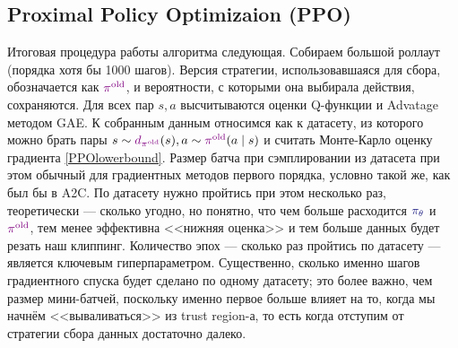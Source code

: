 \subsection{Proximal Policy Optimizaion (PPO)}

Итоговая процедура работы алгоритма следующая. Собираем большой роллаут (порядка хотя бы 1000 шагов). Версия стратегии, использовавшаяся для сбора, обозначается как $\textcolor{ChadPurple}{\pi^{\old}}$, и вероятности, с которыми она выбирала действия, сохраняются. Для всех пар $s, a$ высчитываются оценки Q-функции и Advatage методом GAE. К собранным данным относимся как к датасету, из которого можно брать пары $s \sim \textcolor{ChadPurple}{d_{\pi^{\old}}}(s), a \sim \textcolor{ChadPurple}{\pi^{\old}}(a \mid s)$ и считать Монте-Карло оценку градиента \eqref{PPOlowerbound}. Размер батча при сэмплировании из датасета при этом обычный для градиентных методов первого порядка, условно такой же, как был бы в A2C. По датасету нужно пройтись при этом несколько раз, теоретически --- сколько угодно, но понятно, что чем больше расходится $\textcolor{ChadBlue}{\pi_\theta}$ и $\textcolor{ChadPurple}{\pi^{\old}}$, тем менее эффективна <<нижняя оценка>> и тем больше данных будет резать наш клиппинг. Количество эпох --- сколько раз пройтись по датасету --- является ключевым гиперпараметром. Существенно, сколько именно шагов градиентного спуска будет сделано по одному датасету; это более важно, чем размер мини-батчей, поскольку именно первое больше влияет на то, когда мы начнём <<вываливаться>> из trust region-а, то есть когда отступим от стратегии сбора данных достаточно далеко. 

